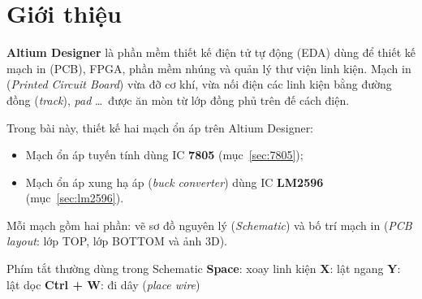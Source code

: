 \section*{Giới thiệu}
\textbf{Altium Designer} là phần mềm thiết kế điện tử tự động (EDA) dùng để thiết kế mạch in (PCB), FPGA, phần mềm nhúng và quản lý thư viện linh kiện. Mạch in (\textit{Printed Circuit Board}) vừa đỡ cơ khí, vừa nối điện các linh kiện bằng đường đồng (\textit{track}), \textit{pad} \dots\ được ăn mòn từ lớp đồng phủ trên đế cách điện.


Trong bài này, thiết kế hai mạch ổn áp trên Altium Designer:
\begin{itemize}
  \item Mạch ổn áp tuyến tính dùng IC \textbf{7805} (mục~\ref{sec:7805});
  \item Mạch ổn áp xung hạ áp (\textit{buck converter}) dùng IC \textbf{LM2596} (mục~\ref{sec:lm2596}).
\end{itemize}
Mỗi mạch gồm hai phần: vẽ sơ đồ nguyên lý (\textit{Schematic}) và bố trí mạch in (\textit{PCB layout}: lớp TOP, lớp BOTTOM và ảnh 3D).

\begin{notebox}{Phím tắt thường dùng trong Schematic}
\textbf{Space}: xoay linh kiện \quad \textbf{X}: lật ngang \quad \textbf{Y}: lật dọc \quad \textbf{Ctrl + W}: đi dây (\textit{place wire})
\end{notebox}
